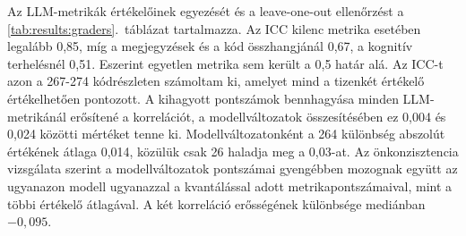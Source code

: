 \documentclass[
]{elteikthesis}[2024/04/26]
\begin{document}
Az LLM-metrikák értékelőinek egyezését és a leave-one-out ellenőrzést a
\ref{tab:results:graders}.~táblázat tartalmazza. Az ICC kilenc metrika esetében
legalább 0,85, míg a megjegyzések és a kód összhangjánál 0,67, a kognitív
terhelésnél 0,51. Eszerint egyetlen metrika sem került a 0,5 határ alá. Az ICC-t
azon a 267-274 kódrészleten számoltam ki, amelyet mind a tizenkét értékelő
értékelhetően pontozott. A kihagyott pontszámok bennhagyása minden
LLM-metrikánál erősítené a korrelációt, a modellváltozatok összesítésében ez
0,004 és 0,024 közötti mértéket tenne ki. Modellváltozatonként a 264 különbség
abszolút értékének átlaga 0,014, közülük csak 26 haladja meg a 0,03-at. Az
önkonzisztencia vizsgálata szerint a modellváltozatok pontszámai gyengébben
mozognak együtt az ugyanazon modell ugyanazzal a kvantálással adott
metrikapontszámaival, mint a többi értékelő átlagával. A két korreláció
erősségének különbsége mediánban $-0{,}095$.
\end{document}
